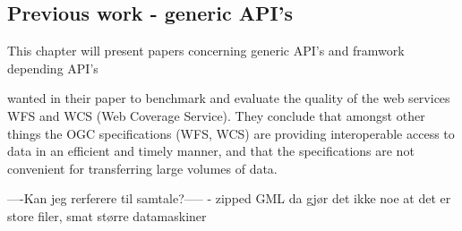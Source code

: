 








\subsection{Previous work - generic API's}
This chapter will present papers concerning generic API's and framwork depending API's


\cite{giuliani2013} wanted in their paper to benchmark and evaluate the quality of the web services WFS and WCS (Web Coverage Service). They conclude that amongst other things the OGC specifications (WFS, WCS) are providing interoperable access to data in an efficient and timely manner, and that the specifications are not convenient for transferring large volumes of data. 

----Kan jeg rerferere til samtale?-----
- zipped GML da gjør det ikke noe at det er store filer, smat større datamaskiner





